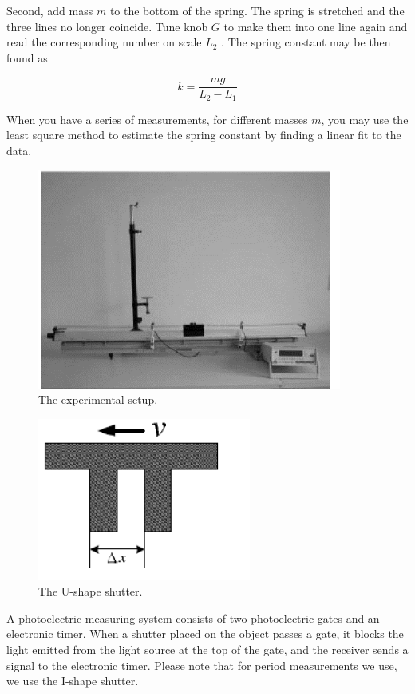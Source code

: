 \documentclass{article}
\begin{document}
Second, add mass $m$ to the bottom of the spring. The spring is stretched and the
three lines no longer coincide. Tune knob $G$ to make them into one line again and read
the corresponding number on scale $L_2$ . The spring constant may be then found as

\begin{equation}\label{eq-6}
k=\frac{mg}{L_2-L_1}
\end{equation}

When you have a series of measurements, for different masses $m$, you may use the least
square method to estimate the spring constant by finding a linear fit to the data.\\

\begin{figure}[!t]
	\centering
	\includegraphics[width=10cm]{fig-3.png}
	\caption{The experimental setup.
	\label{fig-3}}
\end{figure}

\begin{figure}[!t]
	\centering
	\includegraphics[width=7cm]{fig-4.png}
	\caption{The U-shape shutter.
	\label{fig-4}}
\end{figure}

A photoelectric measuring system consists of two photoelectric gates and an electronic
timer. When a shutter placed on the object passes a gate, it blocks the light emitted from
the light source at the top of the gate, and the receiver sends a signal to the electronic
timer. Please note that for period measurements we use, we use the I-shape shutter.\\
\end{document}
